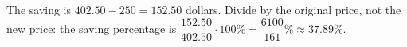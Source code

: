 The saving is $402.50-250=152.50$ dollars. Divide by the original price, not the new price: the saving percentage is $\dfrac{152.50}{402.50}\cdot100\%=\boxed{\dfrac{6100}{161}\%}\approx\boxed{37.89\%}$.
